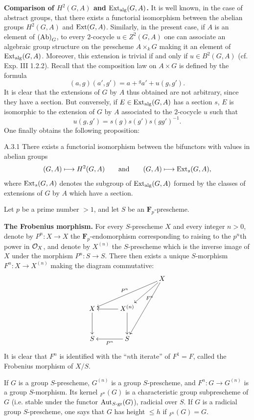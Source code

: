 \label{XVII.A.3}\textbf{Comparison of $H^2(G,A)$ and $\operatorname{Ext}_{\mathrm{alg}}(G,A)$.}
It is well known, in the case of abstract groups, that there exists a functorial isomorphism between the abelian groups $H^2(G,A)$ and $\operatorname{Ext}(G,A)$. Similarly, in the present case, if $A$ is an element of $\textup{(Ab)}_G$, to every $2$-cocycle $u\in Z^2(G,A)$ one can associate an algebraic group structure on the prescheme $A\times_k G$ making it an element of $\operatorname{Ext}_{\mathrm{alg}}(G,A)$. Moreover, this extension is trivial if and only if $u\in B^2(G,A)$ (cf. Exp. III 1.2.2). Recall that the composition law on $A\times G$ is defined by the formula
\[
(a,g)(a',g')=a+{}^ga'+u(g,g').
\]
It is clear that the extensions of $G$ by $A$ thus obtained are not arbitrary, since they have a section. But conversely, if $E\in\operatorname{Ext}_{\mathrm{alg}}(G,A)$ has a section $s$, $E$ is isomorphic to the extension of $G$ by $A$ associated to the $2$-cocycle $u$ such that
\[
u(g,g')=s(g)s(g')s(gg')^{-1}.
\]
One finally obtains the following proposition:
\begin{proposition}{A.3.1}\label{XVII.A.3.1}
There exists a functorial isomorphism between the bifunctors with values in abelian groups
\[
(G,A)\longmapsto H^2(G,A)\qquad\text{and}\qquad(G,A)\longmapsto\operatorname{Ext}_s(G,A),
\]
where $\operatorname{Ext}_s(G,A)$ denotes the subgroup of $\operatorname{Ext}_{\mathrm{alg}}(G,A)$ formed by the classes of extensions of $G$ by $A$ which have a section.
\end{proposition}

Let $p$ be a prime number $>1$, and let $S$ be an $\mathbf F_p$-prescheme.

\label{XVII.B.1}\textbf{The Frobenius morphism.}
For every $S$-prescheme $X$ and every integer $n>0$, denote by $P^n:X\to X$ the $\mathbf F_p$-endomorphism corresponding to raising to the $p^n$th power in $\mathcal{O}_X$, and denote by $X^{(n)}$ the $S$-prescheme which is the inverse image of $X$ under the morphism $P^n:S\to S$. There then exists a unique $S$-morphism $F^n:X\to X^{(n)}$ making the diagram commutative:
\[
\xymatrix@C=3em@R=3em{&&X\ar[dll]_{P^n}\ar[dl]^{F^n}\ar[ddl]\\X\ar[d]&X^{(n)}\ar[l]\ar[d]&\\S&S\ar[l]^{P^n}&}
\]
It is clear that $F^n$ is identified with the ``$n$th iterate'' of $F^1=F$, called the Frobenius morphism of $X/S$.

If $G$ is a group $S$-prescheme, $G^{(n)}$ is a group $S$-prescheme, and $F^n:G\to G^{(n)}$ is a group $S$-morphism. Its kernel ${}_{F^n}(G)$ is a characteristic group subprescheme of $G$ (i.e. stable under the functor $\operatorname{Aut}_{S\text{-gr}}(G)$), radicial over $S$. If $G$ is a radicial group $S$-prescheme, one says that $G$ has height $\leq h$ if ${}_{F^h}(G)=G$.

